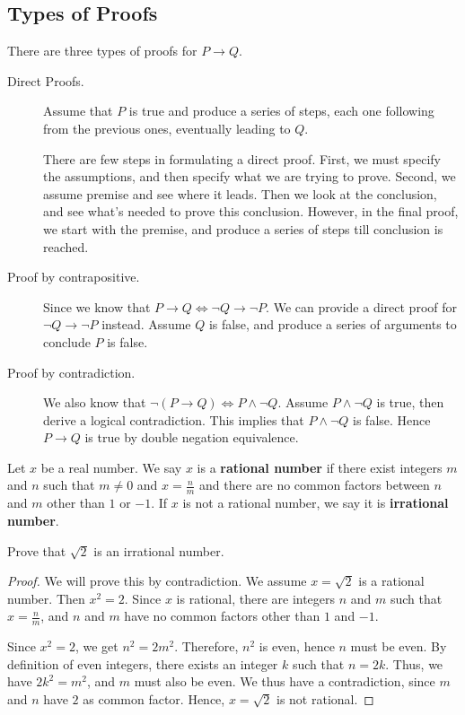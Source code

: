 \documentclass[a4paper,english,12pt]{article}
\begin{document}
\subsection{Types of Proofs }
There are three types of proofs for $P\rightarrow Q$. 
\begin{description}
\item [Direct Proofs.] Assume that $P$ is true and produce a series of steps, each one following from the previous ones, eventually leading to $Q$.

There are few steps in formulating a direct proof. First, we must specify the assumptions, and then specify what we are trying to prove. Second, we assume premise and see where it leads. Then we look at the conclusion, and see what's needed to prove this conclusion. However, in the final proof, we start with the premise, and produce a series of steps till conclusion is reached.
\item [Proof by contrapositive.] Since we know that $P \rightarrow Q \Leftrightarrow \neg Q \rightarrow \neg P$. We can provide a direct proof for $\neg Q \rightarrow \neg P$ instead. Assume $Q$ is false, and produce a series of arguments to conclude $P$ is false.

\item [Proof by contradiction.] We also know that $\neg(P\rightarrow Q) \Leftrightarrow P\wedge\neg Q$. Assume $P\wedge\neg Q$ is true, then derive a logical contradiction. This implies that $P\wedge\neg Q$ is false. Hence $P\rightarrow Q$ is true by double negation equivalence.
\end{description}

\begin{defn} Let $x$ be a real number. We say $x$ is a \textbf{rational number} if there exist integers $m$ and $n$ such that $m\neq 0$ and $x=\frac{n}{m}$ and there are no common factors between $n$ and $m$ other than $1$ or $-1$. If $x$ is not a rational number, we say it is \textbf{irrational number}.
\end{defn}

\begin{thm} Prove that $\sqrt{2}$ is an irrational number.
\end{thm}
\begin{proof} We will prove this by contradiction. We assume $x = \sqrt{2}$ is a rational number. Then $x^2=2$. Since $x$ is rational, there are integers $n$ and $m$ such that $x = \frac{n}{m}$, and $n$ and $m$ have no common factors other than $1$ and $-1$. 

Since $x^2 = 2$, we get $n^2 = 2m^2$. Therefore, $n^2$ is even, hence $n$ must be even. By definition of even integers, there exists an integer $k$ such that $n=2k$. Thus, we have $2k^2 = m^2$, and $m$ must also be even. We thus have a contradiction, since $m$ and $n$ have $2$ as common factor. Hence, 
$x=\sqrt{2}$ is not rational.
\end{proof}
\end{document}
